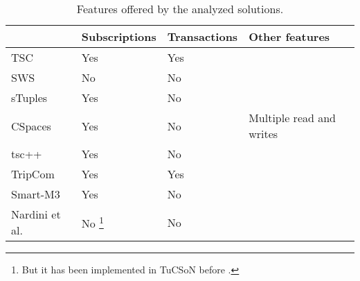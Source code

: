 
\begin{table}[htbp]
\caption{Features offered by the analyzed solutions.}

\begin{tabular}{ l p{3cm} l p{4cm} }
\hline 
  & Subscriptions  & Transactions  & Other features \tabularnewline
\hline 
 TSC & Yes  & Yes  &  \tabularnewline
 SWS & No  & No  &  \tabularnewline
 sTuples & Yes  & No  &  \tabularnewline
 CSpaces & Yes  & No  & Multiple read and writes \tabularnewline %
 tsc++ & Yes  & No  &  \tabularnewline
 TripCom & Yes  & Yes  &  \tabularnewline
 Smart-M3 & Yes  & No  &  \tabularnewline
 Nardini et al. & No \footnote{But it has been implemented in TuCSoN before \cite{ricci_extending_2002}.} & No  &  \tabularnewline
\hline 
\end{tabular}
\label{tab:compAdds} 
\end{table}

